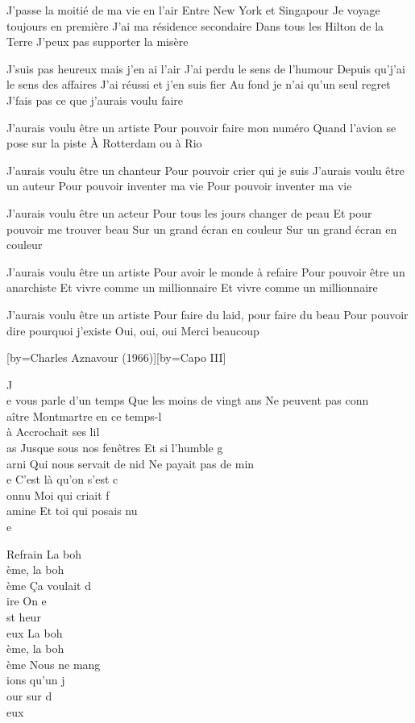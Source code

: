 \beginverse
J'passe la moitié de ma vie en l'air
Entre New York et Singapour
Je voyage toujours en première
J'ai ma résidence secondaire
Dans tous les Hilton de la Terre
J'peux pas supporter la misère
\endverse

\beginverse
J'suis pas heureux mais j'en ai l'air
J'ai perdu le sens de l'humour
Depuis qu'j'ai le sens des affaires
J'ai réussi et j'en suis fier
Au fond je n'ai qu'un seul regret
J'fais pas ce que j'aurais voulu faire
\endverse

\beginverse
J'aurais voulu être un artiste
Pour pouvoir faire mon numéro
Quand l'avion se pose sur la piste
À Rotterdam ou à Rio
\endverse

\beginverse
J'aurais voulu être un chanteur
Pour pouvoir crier qui je suis
J'aurais voulu être un auteur
Pour pouvoir inventer ma vie
Pour pouvoir inventer ma vie
\endverse

\beginverse
J'aurais voulu être un acteur
Pour tous les jours changer de peau
Et pour pouvoir me trouver beau
Sur un grand écran en couleur
Sur un grand écran en couleur
\endverse

\beginverse
J'aurais voulu être un artiste
Pour avoir le monde à refaire
Pour pouvoir être un anarchiste
Et vivre comme un millionnaire
Et vivre comme un millionnaire
\endverse

\beginverse
J'aurais voulu être un artiste
Pour faire du laid, pour faire du beau
Pour pouvoir dire pourquoi j'existe
Oui, oui, oui
Merci beaucoup
\endverse

[by={Charles Aznavour (1966)}][by={Capo III}]

\beginverse
J\\[Rém]e vous parle d'un temps
Que les moins de vingt ans
Ne peuvent pas conn\\[Lam]aître
Montmartre en ce temps-l\\[Rém]à
Accrochait ses lil\\[Lam]as
Jusque sous nos fenêtres
Et si l'humble g\\[Rém]arni
Qui nous servait de nid
Ne payait pas de min\\[Lam]e
C'est là qu'on s'est c\\[Rém]onnu
Moi qui criait f\\[Mi7]amine
Et toi qui posais nu\\[Lam]e
\endverse

	Refrain
La boh\\[Rém]ème, la boh\\[Lam]ème
Ça voulait d\\[Rém]ire
On e\\[Mi7]st heur\\[Lam]eux
La boh\\[Rém]ème, la boh\\[Lam]ème
Nous ne mang\\[Rém]ions qu'un j\\[Mi7]our sur d\\[Lam]eux


